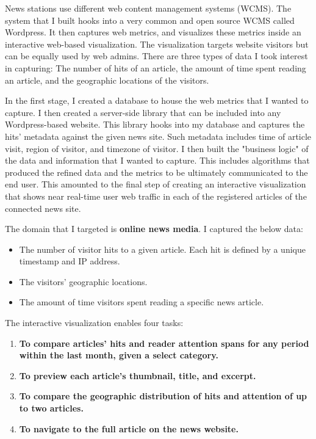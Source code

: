 \documentclass[12pt]{article}
\begin{document}
News stations use different web content management systems (WCMS). The system that I built hooks into a very common and open source WCMS called Wordpress. It then captures web metrics, and visualizes these metrics inside an interactive web-based visualization. The visualization targets website visitors but can be equally used by web admins. There are three types of data I took interest in capturing: The number of hits of an article, the amount of time spent reading an article, and the geographic locations of the visitors. 

In the first stage, I created a database to house the web metrics that I wanted to capture. I then created a server-side library that can be included into any Wordpress-based website. This library hooks into my database and captures the hits' metadata against the given news site. Such metadata includes time of article visit, region of visitor, and timezone of visitor.  
I then built the "business logic" of the data and information that I wanted to capture. This includes algorithms that produced the refined data and the metrics to be ultimately communicated to the end user.
This amounted to the final step of creating an interactive visualization that shows near real-time user web traffic in each of the registered articles of the connected news site.

The domain that I targeted is \textbf{online news media}. I captured the below data:
\begin{itemize}
\item The number of visitor hits to a given article. Each hit is defined by a unique timestamp and IP address.
\item The visitors' geographic locations.
\item The amount of time visitors spent reading a specific news article.
\end{itemize}

\newpage

\noindent The interactive visualization enables four tasks:
\begin{enumerate}
\item \textbf{To compare articles' hits and reader attention spans for any period within the last month, given a select category.}
\item \textbf{To preview each article's thumbnail, title, and excerpt.}
\item \textbf{To compare the geographic distribution of hits and attention of up to two articles.}
\item \textbf{To navigate to the full article on the news website.}
\end{enumerate}
\end{document}

